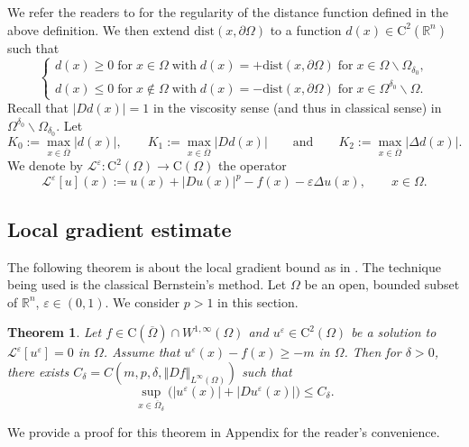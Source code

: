 \documentclass[11pt,reqno]{amsart}
\numberwithin{figure}{section}
\theoremstyle{plain}
\newtheorem{thm}{Theorem}[section]
\theoremstyle{remark}
\numberwithin{equation}{section}
\newcommand{\R}{\mathbb{R}}
\newcommand{\rmC}{\mathrm{C}}
\begin{document}
We refer the readers to \cite{gilbarg_elliptic_2001} for the regularity of the distance function defined in the above definition. We then extend $\mathrm{dist}(x,\partial\Omega)$ to a function $d(x)\in \mathrm{C}^2(\mathbb{R}^n)$ such that 
\begin{equation}\label{e:distance_def}
    \begin{cases}
    d(x)\geq 0\;\text{for}\;x\in\Omega\;\text{with}\;d(x) = +\mathrm{dist}(x,\partial\Omega)\;\text{for}\;x\in \Omega\backslash \Omega_{\delta_0},\\
    d(x)\leq 0\;\text{for}\;x\notin \Omega\;\text{with}\;d(x) = -\mathrm{dist}(x,\partial\Omega)\;\text{for}\;x\in \Omega^{\delta_0}\backslash \Omega.
    \end{cases}
\end{equation}
Recall that $|D d(x)| = 1$ in the viscosity sense (and thus in classical sense) in $\Omega^{\delta_0}\backslash \Omega_{\delta_0}$. Let 
\begin{equation}\label{boundond}
   K_0:= \max_{x\in \overline{\Omega}}|d(x)|, \qquad K_1 := \max_{x\in \overline{\Omega}} |D d(x)| \qquad\text{and}\qquad K_2 := \max_{x\in \overline{\Omega}} |\Delta d(x)|.
\end{equation}
\noindent We denote by $\mathcal{L}^\varepsilon:\rmC^2(\Omega)\to \rmC(\Omega)$ the operator
\begin{equation*}
    \mathcal{L}^\varepsilon[u](x) :=   u(x) + |Du(x)|^p - f(x) - \varepsilon \Delta u(x), \qquad x\in \Omega.
\end{equation*}



\subsection{Local gradient estimate} 
The following theorem is about the local gradient bound as in \cite[Appendix]{Lasry1989}. The technique being used is the classical Bernstein's method. Let $\Omega$ be an open, bounded subset of $\R^n$, $\varepsilon \in (0,1)$. We consider $p>1$ in this section.

\begin{thm}\label{thm:grad_1} Let $f\in \rmC(\overline{\Omega})\cap W^{1,\infty}(\Omega)$ and $u^\varepsilon \in \mathrm{C}^2(\Omega)$ be a solution to $\mathcal{L}^\varepsilon[u^\varepsilon] = 0$ in $\Omega$. Assume that $  u^\varepsilon(x)-f(x)\geq -m$ in $\Omega$. Then for $\delta>0$, there exists $C_\delta = C(m,p,\delta, \Vert D f\Vert_{L^\infty(\Omega)})$ such that 
\begin{equation*}
    \sup_{x\in \overline{\Omega}_\delta} \Big(|u^\varepsilon(x)|+|Du^\varepsilon(x)|\Big) \leq C_\delta.
\end{equation*}
\end{thm}
\noindent We provide a proof for this theorem in Appendix for the reader's convenience.
\end{document}
